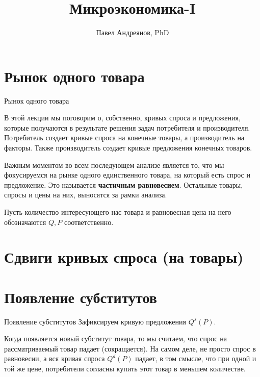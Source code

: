 \documentclass{beamer}
\title{
Микроэкономика-I
}
\author{
Павел Андреянов, PhD
}
\begin{document}
\maketitle

\section{Рынок одного товара}

\begin{frame}{Рынок одного товара}
	
В этой лекции мы поговорим о, собственно, кривых спроса и предложения, которые получаются в результате решения задач потребителя и производителя. Потребитель создает кривые спроса на конечные товары, а производитель на факторы. Также производитель создает кривые предложения конечных товаров.

Важным моментом во всем последующем анализе является то, что мы фокусируемся на рынке одного единственного товара, на который есть спрос и предложение. Это называется \textbf{частичным равновесием}. Остальные товары, спросы и цены на них, выносятся за рамки анализа.

Пусть количество интересующего нас товара и равновесная цена на него обозначаются $Q,P$ соответственно.
	
\end{frame}

\section{Сдвиги кривых спроса (на товары)}

\section{Появление субститутов}

\begin{frame}{Появление субститутов}
Зафиксируем кривую предложения $Q^s(P)$.

Когда появляется новый субститут товара, то мы считаем, что спрос на рассматриваемый товар падает (сокращается). На самом деле, не просто спрос в равновесии, а вся кривая спроса $Q^d(P)$ падает, в том смысле, что при одной и той же цене, потребители согласны купить этот товар в меньшем количестве.

\end{frame}
\end{document}
